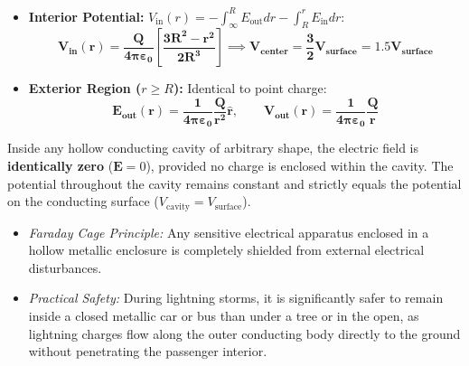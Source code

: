 \documentclass[10pt,a4paper]{article}
\begin{document}
\begin{formulabox}
\begin{itemize}
  \begin{equation}
    E(r) \cdot 4\pi r^2 = \frac{Q r^3}{\varepsilon_0 R^3} \implies \mathbf{E_{\text{in}}(r) = \frac{1}{4\pi\varepsilon_0}\frac{Q r}{R^3}\hat{\mathbf{r}} = \frac{\rho r}{3\varepsilon_0}\hat{\mathbf{r}}}
  \end{equation}
  Electric field increases linearly with radial distance $r$ from center.
  \item \textbf{Interior Potential:} $V_{\text{in}}(r) = -\int_\infty^R E_{\text{out}} dr - \int_R^r E_{\text{in}} dr$:
  \begin{equation}
    \mathbf{V_{\text{in}}(r) = \frac{Q}{4\pi\varepsilon_0}\left[\frac{3R^2 - r^2}{2R^3}\right]} \implies \mathbf{V_{\text{center}} = \frac{3}{2} V_{\text{surface}} = 1.5 V_{\text{surface}}}
  \end{equation}
  \item \textbf{Exterior Region ($r \ge R$):} Identical to point charge:
  \begin{equation}
    \mathbf{E_{\text{out}}(r) = \frac{1}{4\pi\varepsilon_0}\frac{Q}{r^2}\hat{\mathbf{r}}}, \qquad \mathbf{V_{\text{out}}(r) = \frac{1}{4\pi\varepsilon_0}\frac{Q}{r}}
  \end{equation}
\end{itemize}
\end{formulabox}

\begin{ncertbox}
Inside any hollow conducting cavity of arbitrary shape, the electric field is \textbf{identically zero} ($\mathbf{E} = 0$), provided no charge is enclosed within the cavity. The potential throughout the cavity remains constant and strictly equals the potential on the conducting surface ($V_{\text{cavity}} = V_{\text{surface}}$).
\begin{itemize}
  \item \textit{Faraday Cage Principle:} Any sensitive electrical apparatus enclosed in a hollow metallic enclosure is completely shielded from external electrical disturbances.
  \item \textit{Practical Safety:} During lightning storms, it is significantly safer to remain inside a closed metallic car or bus than under a tree or in the open, as lightning charges flow along the outer conducting body directly to the ground without penetrating the passenger interior.
\end{itemize}
\end{ncertbox}
\end{document}
